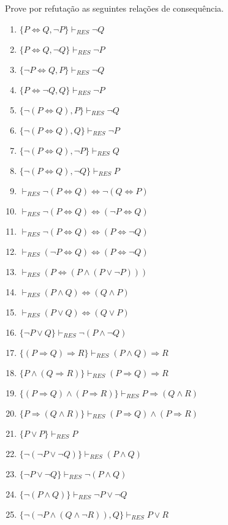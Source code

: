 \begin{exercise}
    Prove por refutação as seguintes relações de consequência.
\end{exercise}

\begin{enumerate}
    \item $\{P \Leftrightarrow Q, \neg P\} \vdash_{RES} \neg Q$
    \item $\{P \Leftrightarrow Q, \neg Q\} \vdash_{RES} \neg P$
    \item $\{\neg P \Leftrightarrow Q, P\} \vdash_{RES} \neg Q$
    \item $\{P \Leftrightarrow \neg Q, Q\} \vdash_{RES} \neg P$
    \item $\{\neg (P \Leftrightarrow Q), P\} \vdash_{RES} \neg Q$
    \item $\{\neg (P \Leftrightarrow Q), Q\} \vdash_{RES} \neg P$
    \item $\{\neg (P \Leftrightarrow Q), \neg P\} \vdash_{RES} Q$
    \item $\{\neg (P \Leftrightarrow Q), \neg Q\} \vdash_{RES} P$
    \item $\vdash_{RES} \neg (P \Leftrightarrow Q) \Leftrightarrow \neg (Q \Leftrightarrow P)$
    \item $\vdash_{RES} \neg (P \Leftrightarrow Q) \Leftrightarrow (\neg P \Leftrightarrow Q)$
    \item $\vdash_{RES} \neg (P \Leftrightarrow Q) \Leftrightarrow (P \Leftrightarrow \neg Q)$
    \item $\vdash_{RES} (\neg P \Leftrightarrow Q) \Leftrightarrow (P \Leftrightarrow \neg Q)$
    \item $\vdash_{RES} (P \Leftrightarrow (P \land (P \lor \neg P) ))$
    \item $\vdash_{RES} (P \land Q) \Leftrightarrow (Q \land P)$
    \item $\vdash_{RES} (P \lor  Q) \Leftrightarrow (Q \lor  P)$
    \item $\{\neg P \lor Q\} \vdash_{RES} \neg (P \land \neg Q)$
    \item $\{(P \Rightarrow Q) \Rightarrow R\} \vdash_{RES} (P \land  Q) \Rightarrow R$
    \item $\{P \land  (Q \Rightarrow R)\} \vdash_{RES} (P \Rightarrow Q) \Rightarrow R$
    \item $\{(P \Rightarrow Q) \land  (P \Rightarrow R)\} \vdash_{RES} P \Rightarrow (Q \land  R)$
    \item $\{P \Rightarrow (Q \land  R)\} \vdash_{RES} (P \Rightarrow Q) \land  (P \Rightarrow R)$
    \item $\{P \lor P\} \vdash_{RES} P$
    \item $\{\neg (\neg P \lor \neg Q)\} \vdash_{RES} (P \land Q)$
    \item $\{\neg P \lor \neg Q\} \vdash_{RES} \neg (P \land Q)$
    \item $\{\neg (P \land Q)\} \vdash_{RES} \neg P \lor \neg Q$
    \item $\{\neg (\neg P \land (Q \land \neg R)), Q\} \vdash_{RES} P \lor R$
\end{enumerate}